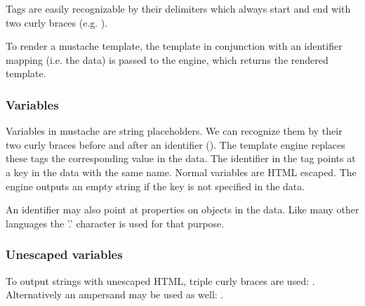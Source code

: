 Tags are easily recognizable by their delimiters which always start and end with
two curly braces (e.g. ).

To render a mustache template, the template in conjunction with an
identifier mapping (i.e. the data) is passed to the engine, which returns the
rendered template.

\subsubsection{Variables}
Variables in mustache are string placeholders. We can recognize them by their
two curly braces before and after an identifier ().
The template engine replaces these tags the corresponding value in the data.
The identifier in the tag points at a key in the data with the same name.
Normal variables are HTML escaped. The engine outputs an empty string if the
key is not specified in the data.

An identifier may also point at properties on objects in the data. Like many
other languages the '.' character is used for that purpose.

\subsubsection{Unescaped variables}
To output strings with unescaped HTML, triple curly braces are used:
. Alternatively an ampersand may be used as well:
.


